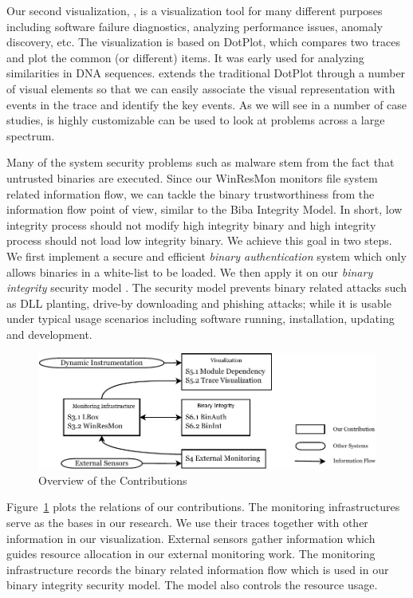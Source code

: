 Our second visualization,  \cite{wu2010visualizing},
is a visualization tool for many different purposes including
software failure diagnostics,
analyzing performance issues, anomaly discovery, etc.
The visualization is based on DotPlot, which compares two traces
and plot the common (or different) items.
It was early used for
analyzing similarities in DNA sequences.
 extends the traditional DotPlot through a number of visual elements
so that we can easily associate the visual representation with events in the
trace and identify the key events.
As we will see in a number of case studies,
 is highly customizable can be used to look at problems
across a large spectrum.

Many of the system security problems such as malware stem from the fact that
untrusted binaries are executed.
Since our WinResMon monitors file system related information flow,
we can tackle the binary trustworthiness from the information
flow point of view, similar to the Biba Integrity Model.
In short, low integrity process should not modify high integrity binary and
high integrity process should not load low integrity binary.
We achieve this goal in two steps.
We first implement a secure and efficient {\em binary authentication} system
\cite{halim2008lightweight,wu2009esi}
which only allows binaries in a white-list to be loaded.
We then apply it on our {\em binary integrity} security model
\cite{wu2010pub,wu2011towards}.
The security model prevents binary related attacks such as DLL planting,
drive-by downloading and phishing attacks;
while it is usable under typical usage scenarios including
software running, installation, updating and development.

\begin{figure}[htb]
\centering
\includegraphics[width=1.0\textwidth]{overview.pdf}
\caption{Overview of the Contributions}
\label{fig:overview}
\end{figure}

Figure~\ref{fig:overview} plots the relations of our contributions.
The monitoring infrastructures serve as the bases in our research.
We use their traces together with other information in our visualization.
External sensors gather information which guides resource allocation
in our external monitoring work.
The monitoring infrastructure records the binary related information flow
which is used in our binary integrity security model.
The model also controls the resource usage.

